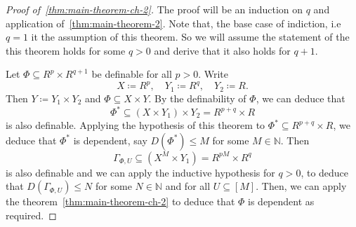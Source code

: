 \begin{proof}[Proof of~\ref{thm:main-theorem-ch-2}]

    The proof will be an induction on $q$ and application of~\ref{thm:main-theorem-2}. Note that, the base case of indiction, i.e $q=1$ it the assumption of this theorem. So we will assume the statement of the this theorem holds for some $q > 0$ and derive that it also holds for $q+1$.

    Let $\Phi \subseteq R^{p} \times R^{q+1}$ be definable for all $p>0$. Write
    \[
        X \coloneq R^p, \quad Y_1 \coloneq R^q, \quad Y_2 \coloneq R.
    \]
    Then $Y \coloneq Y_1 \times Y_2$ and $\Phi \subseteq X \times Y$. By the definability of $\Phi$, we can deduce that
    \[
        \Phi^{*} \subseteq (X \times Y_1) \times Y_2 = R^{p+q} \times R
    \]
    is also definable. Applying the hypothesis of this theorem to $\Phi^{*} \subseteq R^{p+q} \times R$, we deduce that $\Phi^{*}$ is dependent, say $D(\Phi^{*}) \leq M$ for some $M \in \mathbb{N}$. Then
    \[
        \Gamma_{\Phi, U} \subseteq (X^M \times Y_1) = R^{pM} \times R^q
    \]
    is also definable and we can apply the inductive hypothesis for $q > 0$, to deduce that $D(\Gamma_{\Phi, U}) \leq N$ for some $N \in \mathbb{N}$ and for all $U \subseteq [M]$. Then, we can apply the theorem~\ref{thm:main-theorem-ch-2} to deduce that $\Phi$ is dependent as required.
\end{proof}

